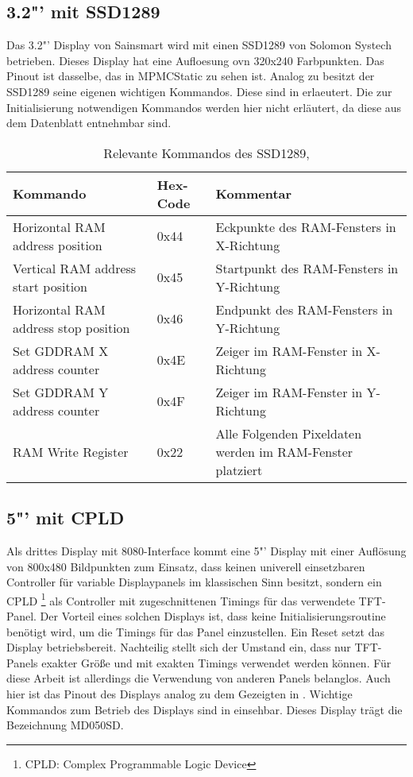 \subsection{3.2"' mit SSD1289}
Das 3.2"' Display von Sainsmart wird mit einen SSD1289 von Solomon Systech betrieben. Dieses Display hat eine Aufloesung ovn 320x240 Farbpunkten. Das Pinout ist dasselbe, das in MPMCStatic zu sehen ist. Analog zu  besitzt der SSD1289 seine eigenen wichtigen Kommandos. Diese sind in   erlaeutert. Die zur Initialisierung notwendigen Kommandos werden hier nicht erläutert, da diese aus dem Datenblatt entnehmbar sind.
\begin{table}[h]
\begin{tabular}{|p{4cm}|p{1cm}|p{8cm}|}\hline
\rowcolor{TableBackgroundColor}
   \textbf{Kommando} & \textbf{Hex-Code} & \textbf{Kommentar}\\ \hline
   Horizontal RAM address position & 0x44 & Eckpunkte des RAM-Fensters in X-Richtung \\ \hline
   Vertical RAM address start position & 0x45 & Startpunkt des RAM-Fensters in Y-Richtung \\ \hline
   Horizontal RAM address stop position & 0x46 & Endpunkt des  RAM-Fensters in Y-Richtung \\ \hline
   Set GDDRAM X address counter & 0x4E & Zeiger im  RAM-Fenster in X-Richtung \\ \hline
   Set GDDRAM Y address counter & 0x4F & Zeiger im RAM-Fenster in Y-Richtung \\ \hline
   RAM Write  Register & 0x22 & Alle Folgenden Pixeldaten werden im RAM-Fenster platziert \\ \hline
\end{tabular}
\caption{Relevante Kommandos des SSD1289, \cite{SSD2007}}
\label{tab:Kommandos_SSD1289}
\end{table}


\subsection{5"' mit CPLD}
Als drittes Display mit 8080-Interface kommt eine 5"' Display mit einer Auflösung von 800x480 Bildpunkten zum Einsatz, dass keinen univerell einsetzbaren Controller für variable Displaypanels im klassischen Sinn besitzt, sondern ein CPLD \footnote{CPLD: Complex Programmable Logic Device} als Controller mit zugeschnittenen Timings für das verwendete TFT-Panel. Der Vorteil eines solchen Displays ist, dass keine Initialisierungsroutine benötigt wird, um die Timings für das Panel einzustellen. Ein Reset setzt das Display betriebsbereit. Nachteilig stellt sich der Umstand ein, dass nur TFT-Panels exakter Größe und mit exakten Timings verwendet werden können. Für diese Arbeit ist allerdings die Verwendung von anderen Panels belanglos. Auch hier ist das Pinout des Displays analog zu dem Gezeigten in .\newline
Wichtige Kommandos zum Betrieb des Displays sind in  einsehbar. Dieses Display trägt die Bezeichnung MD050SD.

